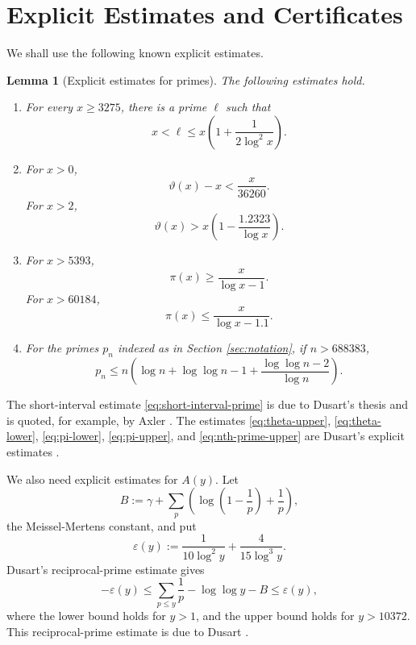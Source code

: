 \documentclass[11pt]{article}
\numberwithin{equation}{section}
\theoremstyle{plain}
\newtheorem{lemma}[theorem]{Lemma}
\theoremstyle{definition}
\theoremstyle{remark}
\newcommand{\eps}{\varepsilon}
\begin{document}
\section{Explicit Estimates and Certificates}
\label{sec:inputs}

We shall use the following known explicit estimates.

\begin{lemma}[Explicit estimates for primes]\label{lem:dusart}
The following estimates hold.
\begin{enumerate}
\item For every \(x\ge 3275\), there is a prime \(\ell\) such that
\begin{equation}\label{eq:short-interval-prime}
x<\ell\le x\left(1+\frac1{2\log^2 x}\right).
\end{equation}
\item For \(x>0\),
\begin{equation}\label{eq:theta-upper}
\vartheta(x)-x<\frac{x}{36260}.
\end{equation}
For \(x>2\),
\begin{equation}\label{eq:theta-lower}
\vartheta(x)>x\left(1-\frac{1.2323}{\log x}\right).
\end{equation}
\item For \(x>5393\),
\begin{equation}\label{eq:pi-lower}
\pi(x)\ge \frac{x}{\log x-1}.
\end{equation}
For \(x>60184\),
\begin{equation}\label{eq:pi-upper}
\pi(x)\le \frac{x}{\log x-1.1}.
\end{equation}
\item For the primes \(p_n\) indexed as in Section \ref{sec:notation}, if \(n>688383\),
\begin{equation}\label{eq:nth-prime-upper}
p_n
        \le
        n\left(
        \log n+\log\log n-1+
        \frac{\log\log n-2}{\log n}
        \right).
\end{equation}
\end{enumerate}
\end{lemma}

The short-interval estimate \eqref{eq:short-interval-prime} is due to Dusart's thesis and is quoted, for example, by Axler \cite{Axler2018}.  The estimates \eqref{eq:theta-upper}, \eqref{eq:theta-lower}, \eqref{eq:pi-lower}, \eqref{eq:pi-upper}, and \eqref{eq:nth-prime-upper} are Dusart's explicit estimates \cite{Dusart2010}.

We also need explicit estimates for \(A(y)\).  Let
\[
        B:=\gamma+\sum_p\left(\log\left(1-\frac1p\right)+\frac1p\right),
\]
the Meissel-Mertens constant, and put
\[
        \eps(y):=\frac1{10\log^2 y}+\frac4{15\log^3 y}.
\]
Dusart's reciprocal-prime estimate gives
\begin{equation}\label{eq:reciprocal-prime-estimate}
-\eps(y)
        \le
        \sum_{p\le y}\frac1p-\log\log y-B
        \le
        \eps(y),
\end{equation}
where the lower bound holds for \(y>1\), and the upper bound holds for \(y>10372\).  This reciprocal-prime estimate is due to Dusart \cite{Dusart2010}.
\end{document}
